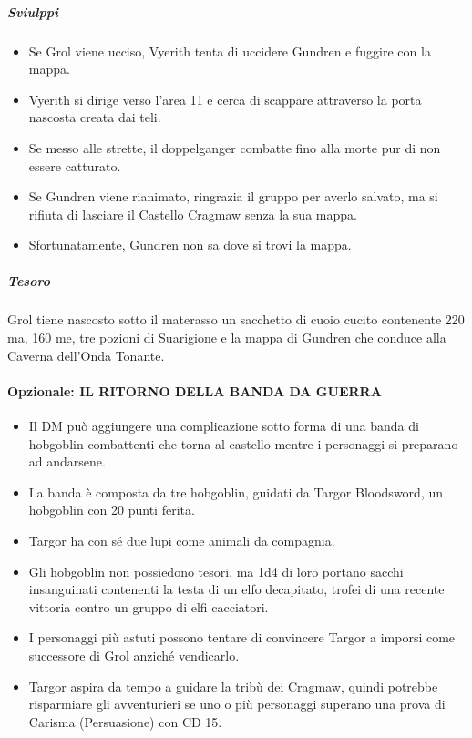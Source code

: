 \documentclass{article}
\begin{document}
    \subparagraph{Sviulppi}
    \begin{itemize}
        \item Se Grol viene ucciso, Vyerith tenta di uccidere Gundren e fuggire con la mappa.
        \item Vyerith si dirige verso l'area 11 e cerca di scappare attraverso la porta nascosta creata dai teli.
        \item Se messo alle strette, il doppelganger combatte fino alla morte pur di non essere catturato.
        \item Se Gundren viene rianimato, ringrazia il gruppo per averlo salvato, ma si rifiuta di lasciare il Castello Cragmaw senza la sua mappa.
        \item Sfortunatamente, Gundren non sa dove si trovi la mappa.
    \end{itemize}

    \subparagraph{Tesoro}
    Grol tiene nascosto sotto il materasso un sacchetto di
cuoio cucito contenente 220 ma, 160 me, tre pozioni di
Suarigione e la mappa di Gundren che conduce alla Caverna
dell’Onda Tonante.


\paragraph{Opzionale: IL RITORNO DELLA BANDA DA GUERRA}
\begin{itemize}
    \item Il DM può aggiungere una complicazione sotto forma di una banda di hobgoblin combattenti che torna al castello mentre i personaggi si preparano ad andarsene.
    \item La banda è composta da tre hobgoblin, guidati da Targor Bloodsword, un hobgoblin con 20 punti ferita.
    \item Targor ha con sé due lupi come animali da compagnia.
    \item Gli hobgoblin non possiedono tesori, ma 1d4 di loro portano sacchi insanguinati contenenti la testa di un elfo decapitato, trofei di una recente vittoria contro un gruppo di elfi cacciatori.
    \item I personaggi più astuti possono tentare di convincere Targor a imporsi come successore di Grol anziché vendicarlo.
    \item Targor aspira da tempo a guidare la tribù dei Cragmaw, quindi potrebbe risparmiare gli avventurieri se uno o più personaggi superano una prova di Carisma (Persuasione) con CD 15.
\end{itemize}
\end{document}
